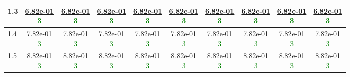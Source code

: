 \begin{table}[H]
\begin{tabular}{|l||c|c|c|c|c|c|c|c|c|}
\hline
 1.3 & \makecell{\ul{6.82e-01} \\ \textcolor{Green}{3}} & \makecell{\ul{6.82e-01} \\ \textcolor{Green}{3}} & \makecell{\ul{6.82e-01} \\ \textcolor{Green}{3}} & \makecell{\ul{6.82e-01} \\ \textcolor{Green}{3}} & \makecell{\ul{6.82e-01} \\ \textcolor{Green}{3}} & \makecell{\ul{6.82e-01} \\ \textcolor{Green}{3}} & \makecell{\ul{6.82e-01} \\ \textcolor{Green}{3}} & \makecell{\ul{6.82e-01} \\ \textcolor{Green}{3}} & \makecell{\ul{6.82e-01} \\ \textcolor{Green}{3}} \\
\hline
 1.4 & \makecell{\ul{7.82e-01} \\ \textcolor{Green}{3}} & \makecell{\ul{7.82e-01} \\ \textcolor{Green}{3}} & \makecell{\ul{7.82e-01} \\ \textcolor{Green}{3}} & \makecell{\ul{7.82e-01} \\ \textcolor{Green}{3}} & \makecell{\ul{7.82e-01} \\ \textcolor{Green}{3}} & \makecell{\ul{7.82e-01} \\ \textcolor{Green}{3}} & \makecell{\ul{7.82e-01} \\ \textcolor{Green}{3}} & \makecell{\ul{7.82e-01} \\ \textcolor{Green}{3}} & \makecell{\ul{7.82e-01} \\ \textcolor{Green}{3}} \\
\hline
 1.5 & \makecell{\ul{8.82e-01} \\ \textcolor{Green}{3}} & \makecell{\ul{8.82e-01} \\ \textcolor{Green}{3}} & \makecell{\ul{8.82e-01} \\ \textcolor{Green}{3}} & \makecell{\ul{8.82e-01} \\ \textcolor{Green}{3}} & \makecell{\ul{8.82e-01} \\ \textcolor{Green}{3}} & \makecell{\ul{8.82e-01} \\ \textcolor{Green}{3}} & \makecell{\ul{8.82e-01} \\ \textcolor{Green}{3}} & \makecell{\ul{8.82e-01} \\ \textcolor{Green}{3}} & \makecell{\ul{8.82e-01} \\ \textcolor{Green}{3}} \\

\end{tabular}
\end{table}
